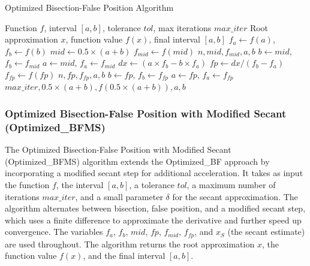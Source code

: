 \documentclass[11pt,a4paper]{article}
\begin{document}
\begin{algorithm}[H]
\caption{Optimized Bisection-False Position Algorithm}
\begin{algorithmic}[1]
\REQUIRE Function $f$, interval $[a,b]$, tolerance $tol$, max iterations $max\_iter$
\ENSURE Root approximation $x$, function value $f(x)$, final interval $[a,b]$
\STATE $f_a \leftarrow f(a)$, $f_b \leftarrow f(b)$
    \STATE $mid \leftarrow 0.5 \times (a + b)$
    \STATE $f_{mid} \leftarrow f(mid)$
        \RETURN $n, mid, f_{mid}, a, b$
    \ENDIF
        \STATE $b \leftarrow mid$, $f_b \leftarrow f_{mid}$
    \ELSE
        \STATE $a \leftarrow mid$, $f_a \leftarrow f_{mid}$
    \ENDIF
    \STATE $dx \leftarrow (a \times f_b - b \times f_a)$
    \STATE $fp \leftarrow dx / (f_b - f_a)$
    \STATE $f_{fp} \leftarrow f(fp)$
        \RETURN $n, fp, f_{fp}, a, b$
    \ENDIF
        \STATE $b \leftarrow fp$, $f_b \leftarrow f_{fp}$
    \ELSE
        \STATE $a \leftarrow fp$, $f_a \leftarrow f_{fp}$
    \ENDIF
\ENDFOR
\RETURN $max\_iter, 0.5 \times (a + b), f(0.5 \times (a + b)), a, b$
\end{algorithmic}
\end{algorithm}

\subsubsection{Optimized Bisection-False Position with Modified Secant (Optimized\_BFMS)}

The Optimized Bisection-False Position with Modified Secant (Optimized\_BFMS) algorithm extends the Optimized\_BF approach by incorporating a modified secant step for additional acceleration. It takes as input the function $f$, the interval $[a, b]$, a tolerance $tol$, a maximum number of iterations $max\_iter$, and a small parameter $\delta$ for the secant approximation. The algorithm alternates between bisection, false position, and a modified secant step, which uses a finite difference to approximate the derivative and further speed up convergence. The variables $f_a$, $f_b$, $mid$, $fp$, $f_{mid}$, $f_{fp}$, and $x_S$ (the secant estimate) are used throughout. The algorithm returns the root approximation $x$, the function value $f(x)$, and the final interval $[a, b]$.
\end{document}
